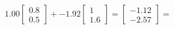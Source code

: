 \documentclass[preview]{standalone}
\begin{document}
\begin{align*}
1.00 \begin{bmatrix} 0.8 \\ 0.5 \end{bmatrix} + -1.92 \begin{bmatrix} 1 \\ 1.6 \end{bmatrix} = \begin{bmatrix} -1.12 \\ -2.57 \end{bmatrix} =
\end{align*}
\end{document}
